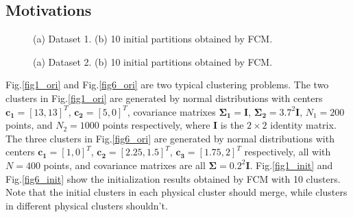 \documentclass[journal,transmag]{IEEEtran}
\theoremstyle{definition}
\begin{document}
\subsection{Motivations}
\label{sec-2-2}
\begin{figure}[!t]
   \centering
\caption{(a) Dataset 1. (b) 10 initial partitions obtained by FCM.}
\label{fig1}
\end{figure}
\begin{figure}[!t]
   \centering
\caption{(a) Dataset 2. (b) 10 initial partitions obtained by FCM.}
\label{fig6}
\end{figure}
Fig.\ref{fig1_ori} and Fig.\ref{fig6_ori} are two typical clustering problems. The two clusters in Fig.\ref{fig1_ori} are generated by normal distributions with centers $\mathbf{c_1}=[13, 13]^T$, $\mathbf{c_2}=[5, 0]^T$, covariance matrixes $\mathbf{\Sigma_1}=\mathbf{I}$, $\mathbf{\Sigma_2}=3.7^2\mathbf{I}$, $N_1=200$ points, and $N_2=1000$ points  respectively, where $\mathbf{I}$ is the $2\times 2$ identity matrix. The three clusters in Fig.\ref{fig6_ori} are generated by normal distributions with  centers $\mathbf{c_1}=[1, 0]^T$, $\mathbf{c_2}=[2.25, 1.5]^T$, $\mathbf{c_3}=[1.75, 2]^T$ respectively, all with $N=400$ points, and covariance matrixes are all $\mathbf{\Sigma}=0.2^2\mathbf{I}$. Fig.\ref{fig1_init} and Fig.\ref{fig6_init} show the initialization results obtained by FCM with 10 clusters. Note that the initial clusters in each physical cluster should merge, while clusters in different physical clusters shouldn't.
\end{document}
